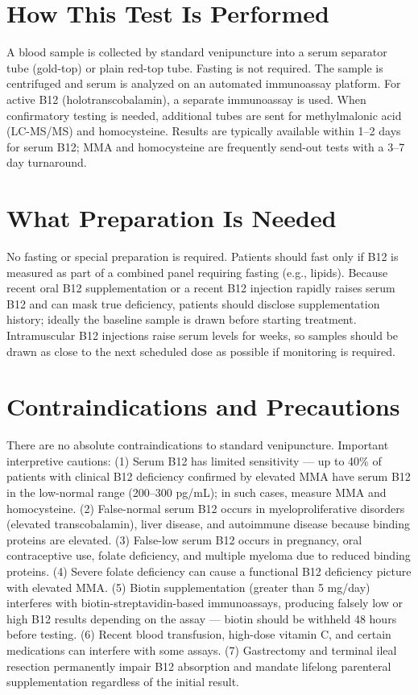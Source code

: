 \section*{How This Test Is Performed}
A blood sample is collected by standard venipuncture into a serum separator tube (gold-top) or plain red-top tube. Fasting is not required. The sample is centrifuged and serum is analyzed on an automated immunoassay platform. For active B12 (holotranscobalamin), a separate immunoassay is used. When confirmatory testing is needed, additional tubes are sent for methylmalonic acid (LC-MS/MS) and homocysteine. Results are typically available within 1--2 days for serum B12; MMA and homocysteine are frequently send-out tests with a 3--7 day turnaround.

\section*{What Preparation Is Needed}
No fasting or special preparation is required. Patients should fast only if B12 is measured as part of a combined panel requiring fasting (e.g., lipids). Because recent oral B12 supplementation or a recent B12 injection rapidly raises serum B12 and can mask true deficiency, patients should disclose supplementation history; ideally the baseline sample is drawn before starting treatment. Intramuscular B12 injections raise serum levels for weeks, so samples should be drawn as close to the next scheduled dose as possible if monitoring is required.

\section*{Contraindications and Precautions}
There are no absolute contraindications to standard venipuncture. Important interpretive cautions: (1) Serum B12 has limited sensitivity --- up to 40\% of patients with clinical B12 deficiency confirmed by elevated MMA have serum B12 in the low-normal range (200--300 pg/mL); in such cases, measure MMA and homocysteine. (2) False-normal serum B12 occurs in myeloproliferative disorders (elevated transcobalamin), liver disease, and autoimmune disease because binding proteins are elevated. (3) False-low serum B12 occurs in pregnancy, oral contraceptive use, folate deficiency, and multiple myeloma due to reduced binding proteins. (4) Severe folate deficiency can cause a functional B12 deficiency picture with elevated MMA. (5) Biotin supplementation (greater than 5 mg/day) interferes with biotin-streptavidin-based immunoassays, producing falsely low or high B12 results depending on the assay --- biotin should be withheld 48 hours before testing. (6) Recent blood transfusion, high-dose vitamin C, and certain medications can interfere with some assays. (7) Gastrectomy and terminal ileal resection permanently impair B12 absorption and mandate lifelong parenteral supplementation regardless of the initial result.

